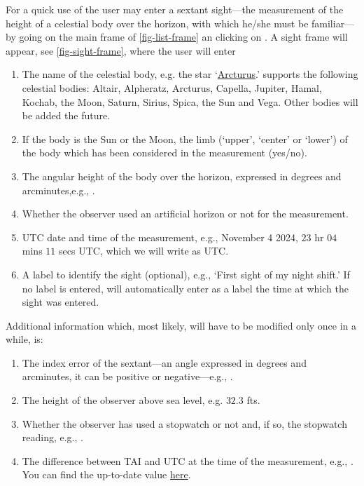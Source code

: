 \documentclass{ol-softwaremanual}
\begin{document}
For a quick use of \thel the user may enter a \gls{sextant} \gls{sight}---the measurement of the height of a celestial body over the horizon, with which he/she must be familiar---by going on the main frame of \cref{fig-list-frame} an clicking on . A \gls{sight} frame will appear, see \cref{fig-sight-frame}, where the user will enter
\begin{enumerate}
  \item \label{item-name} The name of the celestial \gls{body}, e.g. the star `\href{https://fr.wikipedia.org/wiki/Arcturus}{Arcturus}.' \thel supports the following celestial bodies: Altair, Alpheratz, Arcturus, Capella, Jupiter, Hamal, Kochab, the Moon, Saturn, Sirius, Spica, the Sun and Vega. Other bodies will be added the future. 
  \item \label{item-limb}  If the \gls{body} is the Sun or the Moon, the  limb (`upper', `center' or `lower') of the \gls{body} which has been considered in the measurement (yes/no).
  \item \label{item-body-height} The angular height of the  \gls{body} over the horizon, expressed in degrees and arcminutes,e.g., .
  \item \label{item-artificial-horizon} Whether the observer used an artificial horizon or not for the measurement.
  \item \label{item-time} \ac{UTC} date and time of the measurement, e.g.,
  November 4 2024, $23$ \ac{hr}  $04$ \acp{min} $11$ \acp{sec} \ac{UTC}, which we will write as 
    \ac{UTC}.
  \item \label{item-label} A label to identify the \gls{sight} (optional), e.g., `First \gls{sight} of my night shift.' If no label is entered, \thel will automatically enter as a label the time at which the \gls{sight} was entered. 
  \end{enumerate}
  
  Additional information which, most likely, will have to be modified only once in a while, is: 
  \begin{enumerate}[resume]
    \item \label{item-index-error} The index error \cite{bowditch2002the} of the \gls{sextant}---an angle expressed in degrees and arcminutes, it can be positive or negative---e.g., .
    \item \label{item-observer-height} The height of the observer above sea level, e.g. $32.3$ \acp{ft}.
    \item \label{item-stopwatch} Whether the observer has used a stopwatch or not and, if so, the stopwatch reading, e.g., .
    \item \label{item-tai-utc} The difference between \ac{TAI} and \ac{UTC} at the time of the measurement, e.g., .  You can find the up-to-date value  \href{https://en.wikipedia.org/wiki/Leap_second}{here}. 
  \end{enumerate}
\end{document}
